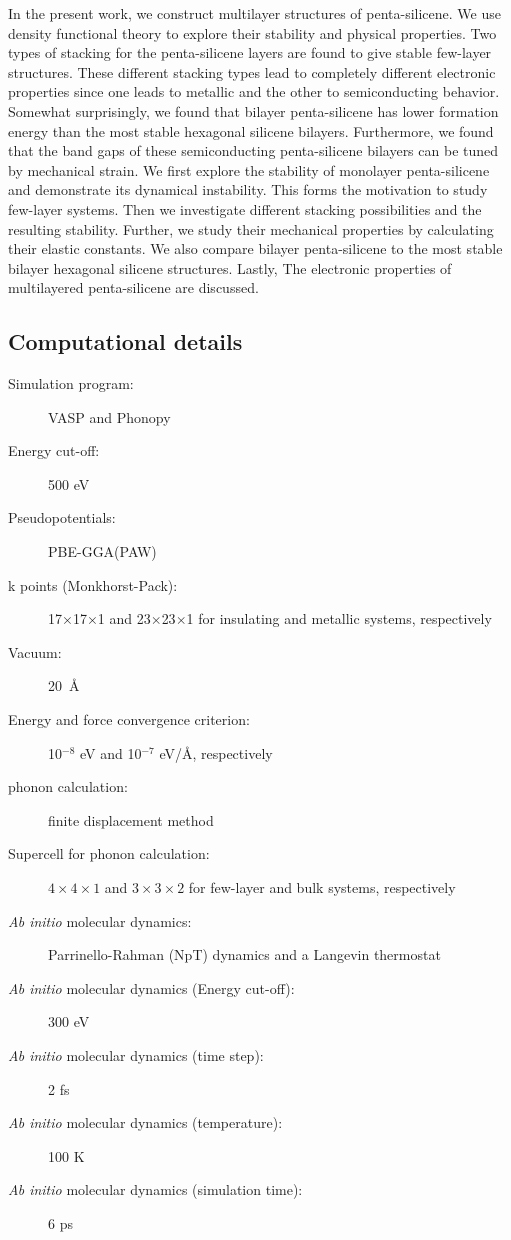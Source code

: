 In the present work, we construct multilayer structures of penta-silicene. We use density functional theory to explore their stability and physical properties. Two types of stacking for the penta-silicene layers are found to give stable few-layer structures. These different stacking types lead to completely different electronic properties since one leads to metallic and the other to semiconducting behavior. Somewhat surprisingly, we found that bilayer penta-silicene has lower formation energy than the most stable hexagonal silicene bilayers. Furthermore, we found that the band gaps of these semiconducting penta-silicene bilayers can be tuned by mechanical strain. We first explore the stability of monolayer penta-silicene and demonstrate its dynamical instability. This forms the motivation to study few-layer systems. Then we investigate different stacking possibilities and the resulting stability. Further, we study their mechanical properties by calculating their elastic constants.  We also compare bilayer penta-silicene to the most stable bilayer hexagonal silicene structures. Lastly, The electronic properties of multilayered penta-silicene are discussed.

\subsection{Computational details}

\begin{footnotesize}
\begin{description}
\item[Simulation program:] VASP and Phonopy
\item[Energy cut-off:] 500 eV
\item[Pseudopotentials:] PBE-GGA(PAW)
\item[k points (Monkhorst-Pack):] 17$\times$17$\times$1 and 23$\times$23$\times$1 for insulating and metallic systems, respectively 
\item[Vacuum:] 20~\AA
\item[Energy and force convergence criterion:] 10$^{-8}$ eV and 10$^{-7}$ eV/\AA, respectively
\item[phonon calculation:] finite displacement method
\item[Supercell for phonon calculation:] $4\times4\times1$ and $3\times3\times2$ for few-layer and bulk systems, respectively
\item[\textit{Ab initio} molecular dynamics:] Parrinello-Rahman (NpT) dynamics \cite{vasp_npt1,vasp_npt2} and a Langevin thermostat \cite{vasp_Lgv}
\item[\textit{Ab initio} molecular dynamics (Energy cut-off):] 300 eV
\item[\textit{Ab initio} molecular dynamics (time step):] 2 fs
\item[\textit{Ab initio} molecular dynamics (temperature):] 100 K
\item[\textit{Ab initio} molecular dynamics (simulation time):] 6 ps
\end{description}
\end{footnotesize}

